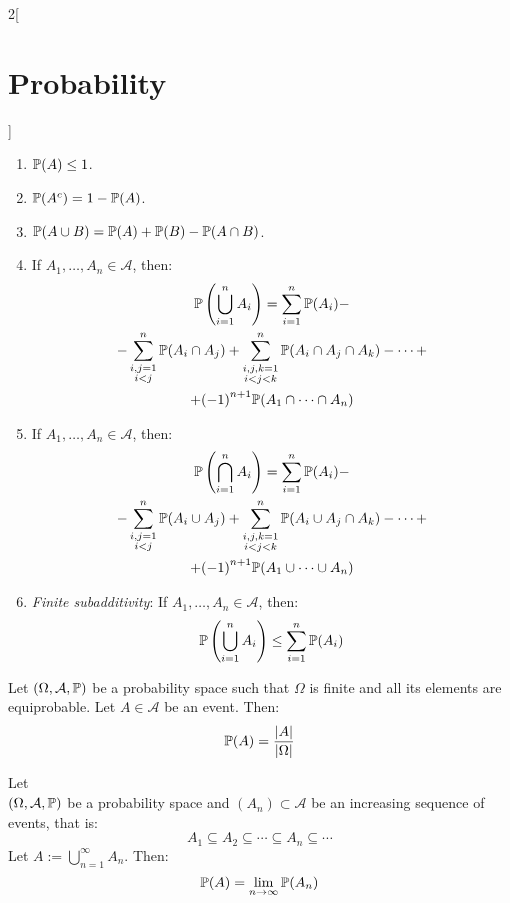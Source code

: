 \documentclass[../../../main_math.tex]{subfiles}
\begin{document}
\begin{multicols}{2}[\section{Probability}]
\begin{proposition}
\begin{enumerate}
      \item $\mathbb{P}(A)\leq 1$.
      \item $\mathbb{P}(A^c)=1-\mathbb{P}(A)$.
      \item $\mathbb{P}(A\cup B) =\mathbb{P}(A)+\mathbb{P}(B)-\mathbb{P}(A\cap B)$.
      \item If $A_1,\ldots,A_n\in\mathcal{A}$, then:
            \begin{multline*}
              \mathbb{P}\left(\bigcup_{i=1}^n A_i\right)=\sum_{i=1}^n \mathbb{P}(A_i)-\\-\sum_{\substack{i,j=1\\i<j}}^n\mathbb{P}(A_i\cap A_j)+\sum_{\substack{i,j,k=1\\i<j<k}}^n\mathbb{P}(A_i\cap A_j\cap A_k)-\cdots+\\+{(-1)}^{n+1}\mathbb{P}(A_1\cap\cdots\cap A_n)
            \end{multline*}
      \item If $A_1,\ldots,A_n\in\mathcal{A}$, then:
            \begin{multline*}
              \mathbb{P}\left(\bigcap_{i=1}^n A_i\right)=\sum_{i=1}^n \mathbb{P}(A_i)-\\-\sum_{\substack{i,j=1\\i<j}}^n\mathbb{P}(A_i\cup A_j)+\sum_{\substack{i,j,k=1\\i<j<k}}^n\mathbb{P}(A_i\cup A_j\cap A_k)-\cdots+\\+{(-1)}^{n+1}\mathbb{P}(A_1\cup\cdots\cup A_n)
            \end{multline*}
      \item \emph{Finite subadditivity}: If $A_1,\ldots,A_n\in\mathcal{A}$, then: $$\mathbb{P}\left(\bigcup_{i=1}^n A_i\right)\leq\sum_{i=1}^n \mathbb{P}(A_i)$$
    \end{enumerate}
  \end{proposition}
  \begin{proposition}
    Let $(\Omega,\mathcal{A},\mathbb{P})$ be a probability space such that $\Omega$ is finite and all its elements are equiprobable. Let $A\in\mathcal{A}$ be an event. Then: $$\mathbb{P}(A)=\frac{|A|}{|\Omega|}$$
  \end{proposition}
  \begin{theorem}
    Let\\ $(\Omega,\mathcal{A},\mathbb{P})$ be a probability space and $(A_n)\subset\mathcal{A}$ be an increasing sequence of events, that is: $$A_1\subseteq A_2\subseteq\cdots\subseteq A_n\subseteq\cdots$$ Let $A:=\bigcup_{n=1}^\infty A_n$. Then: $$\mathbb{P}(A)=\lim_{n\to\infty}\mathbb{P}(A_n)$$
  \end{theorem}

\end{multicols}
\end{document}
